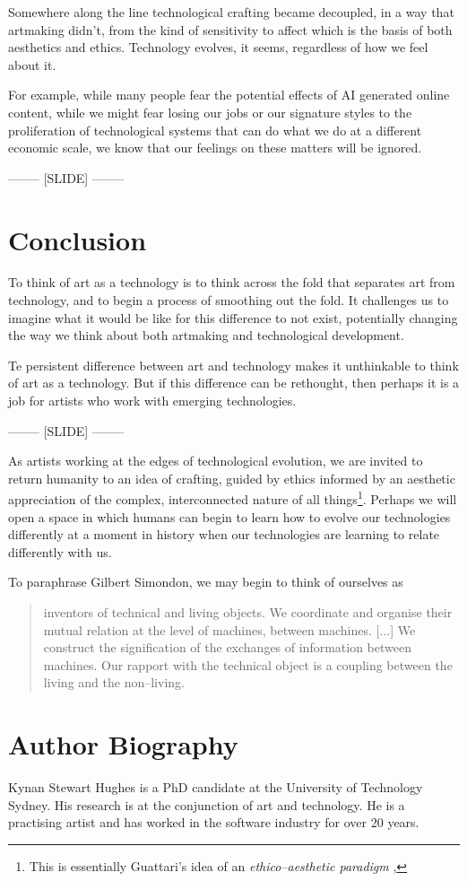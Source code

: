 \documentclass[letter:wpaper]{article}
\begin{document}
    Somewhere along the line technological crafting became decoupled, in a way that artmaking didn't, from the kind of sensitivity to affect which is the basis of both aesthetics and ethics. Technology evolves, it seems, regardless of how we feel about it.
    
    For example, while many people fear the potential effects of AI generated online content, while we might fear losing our jobs or our signature styles to the proliferation of technological systems that can do what we do at a different economic scale, we know that our feelings on these matters will be ignored.
    
-------- [SLIDE] --------

\section{Conclusion}

    To think of art as a technology is to think across the fold that separates art from technology, and to begin a process of smoothing out the fold. It challenges us to imagine what it would be like for this difference to not exist, potentially changing the way we think about both artmaking and technological development.
    
    Te persistent difference between art and technology makes it unthinkable to think of art as a technology. But if this difference can be rethought, then perhaps it is a job for artists who work with emerging technologies. 
    
-------- [SLIDE] --------

    As artists working at the edges of technological evolution, we are invited to return humanity to an idea of crafting, guided by ethics informed by an aesthetic appreciation of the complex, interconnected nature of all things\footnote{
        This is essentially Guattari's idea of an \emph{ethico–aesthetic paradigm} \citep[p.131]{GuattariChsmss1995}, 
    }. Perhaps we will open a space in which humans can begin to learn how to evolve our technologies differently at a moment in history when our technologies are learning to relate differently with us.
    
    To paraphrase Gilbert Simondon, we may begin to think of ourselves as

    \begin{quote}
        inventors of technical and living objects. We coordinate and organise their mutual relation at the level of machines, between machines. [...] We construct the signification of the exchanges of information between machines. Our rapport with the technical object is a coupling between the living and the non–living. \citep[p.xvi]{SimondonOnThMdOfExstncOfTechnclObjcts1980}
    \end{quote}
    



\section{Author Biography}

Kynan Stewart Hughes is a PhD candidate at the University of Technology Sydney. His research is at the conjunction of art and technology. He is a practising artist and has worked in the software industry for over 20 years. 
\end{document}
